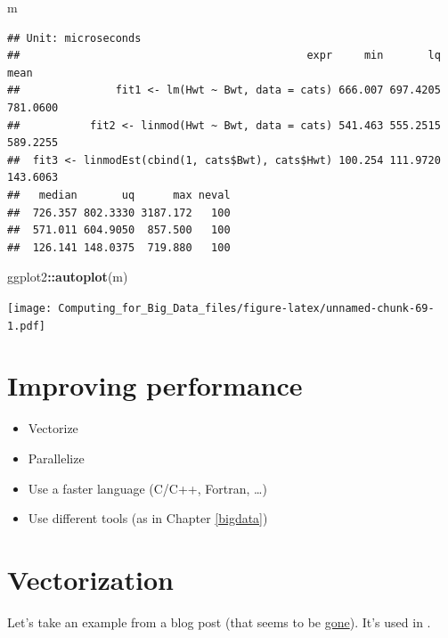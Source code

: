 \documentclass[]{book}
\newenvironment{Shaded}{\begin{snugshade}}{\end{snugshade}}
\newcommand{\KeywordTok}[1]{\textcolor[rgb]{0.13,0.29,0.53}{\textbf{#1}}}
\newcommand{\OperatorTok}[1]{\textcolor[rgb]{0.81,0.36,0.00}{\textbf{#1}}}
\newcommand{\NormalTok}[1]{#1}
\theoremstyle{definition}
\theoremstyle{definition}
\theoremstyle{definition}
\theoremstyle{remark}
\begin{document}
\begin{Shaded}
\begin{Highlighting}[]
\NormalTok{m}
\end{Highlighting}
\end{Shaded}

\begin{verbatim}
## Unit: microseconds
##                                             expr     min       lq     mean
##               fit1 <- lm(Hwt ~ Bwt, data = cats) 666.007 697.4205 781.0600
##           fit2 <- linmod(Hwt ~ Bwt, data = cats) 541.463 555.2515 589.2255
##  fit3 <- linmodEst(cbind(1, cats$Bwt), cats$Hwt) 100.254 111.9720 143.6063
##   median       uq      max neval
##  726.357 802.3330 3187.172   100
##  571.011 604.9050  857.500   100
##  126.141 148.0375  719.880   100
\end{verbatim}

\begin{Shaded}
\begin{Highlighting}[]
\NormalTok{ggplot2}\OperatorTok{::}\KeywordTok{autoplot}\NormalTok{(m)}
\end{Highlighting}
\end{Shaded}

\texttt{[image: Computing\_for\_Big\_Data\_files/figure-latex/unnamed-chunk-69-1.pdf]}

\section{Improving performance}\label{improving-performance}

\begin{itemize}
\item
  Vectorize
\item
  Parallelize
\item
  Use a faster language (C/C++, Fortran, \ldots{})
\item
  Use different tools (as in Chapter \ref{bigdata})
\end{itemize}

\section{Vectorization}\label{vectorization}

Let's take an example from a blog post (that seems to be
\href{http://www.babelgraph.org/wp/?p=358}{gone}). It's used in
\citet[Section
\href{http://adv-r.had.co.nz/Rcpp.html\#rcpp-case-studies}{Case
studies}]{Wickham2014}.
\end{document}

